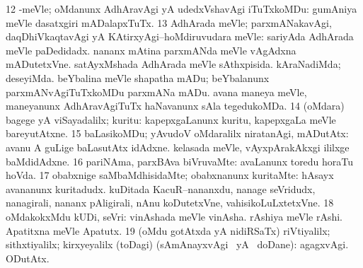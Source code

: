 \num{12} -meVle; oMdanunx AdhAravAgi yA udedxVshavAgi iTuTxkoMDu:  gumAniya meVle dasatxgiri mADalapxTuTx. 
\num{13} AdhArada meVle; parxmANakavAgi, daqDhiVkaqtavAgi yA KAtirxyAgi--hoMdiruvudara meVle:  sariyAda AdhArada meVle paDedidadx.  nananx mAtina parxmANda meVle vAgAdxna mADutetxVne.  satAyxMshada AdhArada meVle sAthxpisida.  kAraNadiMda; deseyiMda.  beYbalina meVle shapatha mADu; beYbalanunx parxmANvAgiTuTxkoMDu parxmANa mADu.  avana maneya meVle, maneyanunx AdhAravAgiTuTx haNavanunx sAla tegedukoMDa. 
\num{14} (oMdara) bagege yA viSayadalilx; kuritu:  kapepxgaLanunx kuritu, kapepxgaLa meVle bareyutAtxne. 
\num{15} baLasikoMDu; yAvudoV oMdaralilx niratanAgi, mADutAtx:  avanu A guLige baLasutAtx idAdxne.  kelasada meVle, vAyxpArakAkxgi ililxge baMdidAdxne. 
\num{16} pariNAma, parxBAva biVruvaMte:  avaLanunx toredu horaTu hoVda. 
\num{17} obabxnige saMbaMdhisidaMte; obabxnanunx kuritaMte:  hAsayx avananunx kuritadudx.  kuDitada KacuR--nananxdu, nanage seVridudx, nanagirali, nananx pAligirali, nAnu koDutetxVne, vahisikoLuLxtetxVne. 
\num{18} oMdakokxMdu kUDi, seVri:  vinAshada meVle vinAsha.  rAshiya meVle rAshi.  Apatitxna meVle Apatutx. 
\num{19} (oMdu gotAtxda yA nidiRSaTx) riVtiyalilx; sithxtiyalilx; kirxyeyalilx (toDagi) (sAmAnayxvAgi  \eng{$+$} \gu\ yA \nA\ doDane):  agagxvAgi.  ODutAtx. 
\enum
\emng

